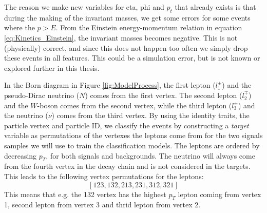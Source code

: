 \documentclass[a4paper, american, 12pt]{report}
\begin{document}
	The reason we make new variables for eta, phi and $p_t$ that already exists is that during the making of the invariant masses, we get some errors for some events where the $p>E$. From the Einstein energy-momentum relation in equation \ref{eq:Kinetics_Einstein}, the invariant masses becomes negative. This is not (physically) correct, and since this does not happen too often we simply drop these events in all features. This could be a simulation error, but is not known or explored further in this thesis.
	
	In the Born diagram in Figure \ref{fig:ModelProcess}, the first lepton ($l_1^{\pm}$) and the pseudo-Dirac neutrino ($N$) comes from the first vertex. The second lepton ($l_2^{\mp}$) and the $W$-boson comes from the second vertex, while the third lepton ($l_3^{\pm}$) and the neutrino ($\nu$) comes from the third vertex. By using the identity traits, the particle vertex and particle ID, we classify the events by constructing a \textit{target} variable as permutations of the vertexes the leptons come from for the two signals samples we will use to train the classification models. The leptons are ordered by decreasing $p_T$, for both signals and backgrounds. The neutrino will always come from the fourth vertex in the decay chain and is not considered in the targets. This leads to the following vertex permutations for the leptons: 
	\begin{equation}
		\label{eq:Permutations}
		[123, 132, 213, 231, 312, 321]
	\end{equation}
	This means that e.g. the 132 vertex has the highest $p_T$ lepton coming from vertex 1, second lepton from vertex 3 and thrid lepton from vertex 2.
	
\end{document}
